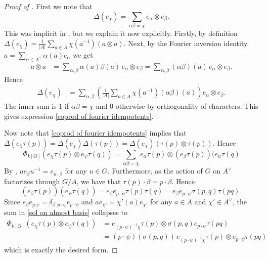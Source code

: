\documentclass[a4paper,10pt]{amsart}
\theoremstyle{definition}
\theoremstyle{remark}
\newcommand\D{\Delta}
\newcommand\ot{\otimes}
\begin{document}
\begin{proof}[Proof of ]
First we note that
\begin{equation}\label{coprod of fourier idempotents}
\D (e_\chi)=\sum_{\alpha\beta=\chi} e_\alpha\otimes e_\beta.
\end{equation}
This was implicit in , but we explain it now explicitly. Firstly, by definition $ \Delta(e_\chi)=\frac{1}{|A|}\sum_{a\in A}\chi(a^{-1})(a\otimes a).$ Next, by the Fourier inversion identity $a=\sum_{\alpha\in A^\vee}\alpha(a)e_\alpha$ we get
\begin{align*}
a\otimes a
&=\sum_{\alpha,\beta}\alpha(a)\beta(a)\, e_\alpha\otimes e_\beta
=\sum_{\alpha,\beta}(\alpha\beta)(a)\, e_\alpha\otimes e_\beta.
\end{align*}
Hence
\begin{align*}
\Delta(e_\chi)
&=\sum_{\alpha,\beta}\left(\frac{1}{|A|}\sum_{a\in A}\chi(a^{-1})(\alpha\beta)(a)\right)e_\alpha\otimes e_\beta.
\end{align*}
The inner sum is $1$ if $\alpha\beta=\chi$ and $0$ otherwise by orthogonality of characters. This gives expression \eqref{coprod of fourier idempotents}. \medskip

Now note that \eqref{coprod of fourier idempotents} implies that $\D(e_{\chi}\tau(p)) = \D(e_{\chi})\D(\tau(p)) = \D(e_{\chi})(\tau(p) \ot \tau(p))$. Hence 
\begin{equation}\label{sol on almost basis}
   \Phi_{k[G]}(e_\chi \tau(p)\otimes e_\psi \tau(q) )
     = \sum_{\alpha\beta=\chi} e_\alpha\tau(p)\otimes (e_\beta\tau(p))(e_{\psi}\tau(q)
\end{equation}
By , $u e_\beta u^{-1}=e_{u\cdot\beta}$ for any $u \in G$. Furthermore, as the action of $G$ on $A^{\vee}$ factorizes through $G/A$, we have that $\tau(p) \cdot \beta = p \cdot \beta$. Hence 
$$(e_\beta\tau(p))(e_{\psi}\tau(q)) = e_{\beta} e_{p\cdot\psi} \tau(p)\tau(q) =  e_{\beta} e_{p\cdot \psi}\sigma(p,q) \tau(pq).$$
Since $e_{\beta} e_{p.\psi} = \delta_{\beta,p\cdot\psi} e_{p\cdot\psi}$ and $a e_{\chi'} = \chi'(a) e_{\chi'}$ for any $a \in A$ and $\chi' \in A^{\vee}$, the sum in \eqref{sol on almost basis} collapses to
\begin{align*}
\Phi_{k[G]}(e_\chi \tau(p)\otimes e_\psi \tau(q) )
     & =  e_{(p\cdot \psi)^{-1}\chi} \tau(p) \ot \sigma(p,q) e_{p\cdot\psi} \tau(pq) \\
     & = (p\cdot \psi) (\sigma(p,q)) \,  e_{(p\cdot \psi)^{-1}\chi} \tau(p) \ot  e_{p\cdot\psi} \tau(pq)
\end{align*}
which is exactly the desired form.
\end{proof}
\end{document}
